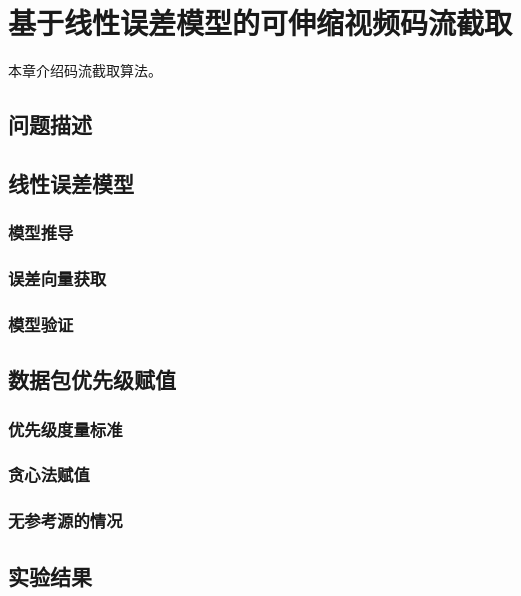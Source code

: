 \chapter{基于线性误差模型的可伸缩视频码流截取}
本章介绍码流截取算法。

\section{问题描述}

\section{线性误差模型}

\subsection{模型推导}

\subsection{误差向量获取}

\subsection{模型验证}

\section{数据包优先级赋值}

\subsection{优先级度量标准}

\subsection{贪心法赋值}

\subsection{无参考源的情况}

\section{实验结果}
